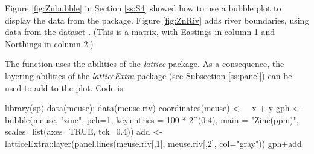 Figure \ref{fig:Znbubble} in Section \ref{ss:S4} showed how to use a
bubble plot to display the  data from the 
package.  Figure \ref{fig:ZnRiv} adds river boundaries, using data from the
dataset .  (This is a matrix, with Eastings in column
1 and Northings in column 2.)

The function  uses the abilities of the {\em lattice}
package. As a consequence, the layering abilities of the {\em
  latticeExtra} package (see Subsection \ref{ss:panel}) can be used to
add to the plot. Code is:


\begin{Schunk}
\begin{Sinput}
library(sp)
data(meuse); data(meuse.riv)
coordinates(meuse) <- ~ x + y
gph <- bubble(meuse, "zinc", pch=1, key.entries =  100 * 2^(0:4),
              main = "Zinc(ppm)", scales=list(axes=TRUE, tck=0.4))
add <- latticeExtra::layer(panel.lines(meuse.riv[,1], meuse.riv[,2],
                      col="gray"))
gph+add
\end{Sinput}
\end{Schunk}

